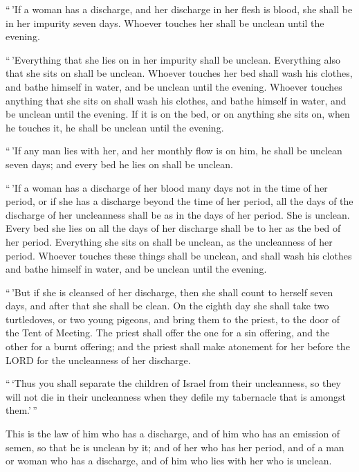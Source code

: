  ``\,'If a woman has a discharge, and her discharge in her
flesh is blood, she shall be in her impurity seven days. Whoever touches
her shall be unclean until the evening.

 ``\,'Everything that she lies on in her impurity shall be
unclean. Everything also that she sits on shall be unclean.
 Whoever touches her bed shall wash his clothes, and bathe
himself in water, and be unclean until the evening. 
Whoever touches anything that she sits on shall wash his clothes, and
bathe himself in water, and be unclean until the evening. 
If it is on the bed, or on anything she sits on, when he touches it, he
shall be unclean until the evening.

 ``\,'If any man lies with her, and her monthly flow is on
him, he shall be unclean seven days; and every bed he lies on shall be
unclean.

 ``\,'If a woman has a discharge of her blood many days not
in the time of her period, or if she has a discharge beyond the time of
her period, all the days of the discharge of her uncleanness shall be as
in the days of her period. She is unclean.  Every bed she
lies on all the days of her discharge shall be to her as the bed of her
period. Everything she sits on shall be unclean, as the uncleanness of
her period.  Whoever touches these things shall be unclean,
and shall wash his clothes and bathe himself in water, and be unclean
until the evening.

 ``\,'But if she is cleansed of her discharge, then she
shall count to herself seven days, and after that she shall be clean.
 On the eighth day she shall take two turtledoves, or two
young pigeons, and bring them to the priest, to the door of the Tent of
Meeting.  The priest shall offer the one for a sin
offering, and the other for a burnt offering; and the priest shall make
atonement for her before the LORD for the uncleanness of her discharge.

 ``\,`Thus you shall separate the children of Israel from
their uncleanness, so they will not die in their uncleanness when they
defile my tabernacle that is amongst them.'\,''

 This is the law of him who has a discharge, and of him who
has an emission of semen, so that he is unclean by it;  and
of her who has her period, and of a man or woman who has a discharge,
and of him who lies with her who is unclean.

